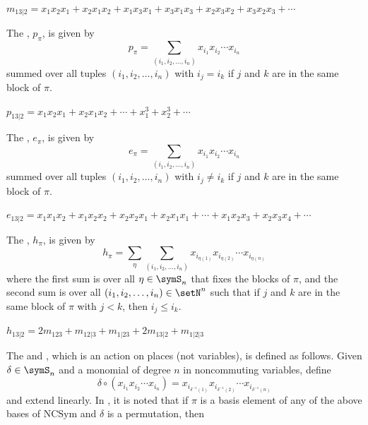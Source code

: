 \begin{example*}[Expansion of $m_{13|2}$]
$m_{13|2}=x_1x_2x_1+x_2x_1x_2+x_1x_3x_1+x_3x_1x_3+x_2x_3x_2+x_3x_2x_3+\cdots$
\end{example*}


The 
\label{NCSymPowerSumBasis}, $p_\pi$, is given by
\[
p_\pi =
\sum _{(i_1, i_2, \dotsc, i_n)} x_{i_1}x_{i_2} \dotsm x_{i_n}
\]
summed over all tuples $(i_1, i_2, \dotsc, i_n)$ with $i_j=i_k$ if $j$ and
$k$ are in the same block of $\pi$.

\begin{example*}[Expansion of $p_{13|2}$]
$p_{13|2}=x_1x_2x_1+x_2x_1x_2+\cdots + x_1^3+x_2^3 +\cdots $
\end{example*}

The 
\label{NCSymElementaryBasis}, $e_\pi$, is given by
\[
e_\pi =
\sum _{(i_1, i_2, \dotsc, i_n)} x_{i_1}x_{i_2} \dotsm x_{i_n}
\]
summed over all tuples $(i_1, i_2, \dotsc, i_n)$ with $i_j\neq i_k$ if $j$
and $k$ are in the same block of $\pi$.

\begin{example*}[Expansion of $e_{13|2}$]
$e_{13|2}= {x_1x_1x_2+x_1x_2x_2+x_2x_2x_1+x_2x_1x_1}+\cdots + x_1x_2x_3+x_2x_3x_4 +\cdots$
\end{example*}

The 
\label{NCSymCompleteHomogeneousBasis}, $h_\pi$, is given by
\begin{equation}
h_{\pi}=
\sum_{\eta} \sum_{(i_1,i_2,\dotsc,i_n)}
x_{i_{\eta(1)}}x_{i_{\eta(2)}}\dotsm x_{i_{\eta(n)}}
\end{equation}
where
the first sum is over all $\eta\in \symS_n$ that fixes the blocks of $\pi$,
and the second sum is over all $(i_1,i_2,\dotsc,i_n)\in \setN^n$ such that if
$j$ and $k$ are in the same block of $\pi$ with $j \lt k$, then
$i_j\leq i_k$.

\begin{example*}[Expansion of $h_{13|2}$]
$h_{13|2}= 2 m_{123} + m_{12|3} + m_{1|23} + 2 m_{13|2} + m_{1|2|3}$
\end{example*}


The \label{NCSymPermutationMap}
\cite[p.~219]{RosasBruce2006} and \cite[p.~230]{GebhardSagan2001},
which is an action on places (not variables), is defined as follows.
Given $\delta \in \symS_n$ and a monomial of degree $n$ in noncommuting variables, define
\[
\delta \circ (x_{i_1}x_{i_2} \dotsm x_{i_n})
= x_{i_{\delta^{-1}(1)}}x_{i_{\delta^{-1}(2)}} \dotsm
x_{i_{\delta^{-1}(n)}}
\]
and extend linearly.
In \cite[p.~219]{RosasBruce2006}, it is noted that if $\pi$ is a basis element
of any of the above bases of $\mathrm{NCSym}$ and $\delta$ is a permutation,
then

